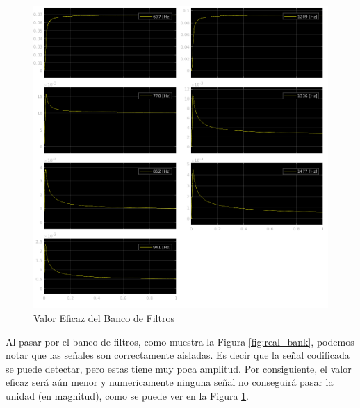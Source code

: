 \begin{figure}[!htb]
  \centering
  \includegraphics[width=\linewidth]{images/simulacion/reducido/rms.png}
  \caption{Valor Eficaz del Banco de Filtros}
  \label{fig:real_rms}
\end{figure}

\pagebreak

Al pasar por el banco de filtros, como muestra la Figura \ref{fig:real_bank}, podemos notar que las señales son correctamente aisladas. Es decir que la señal codificada se puede detectar, pero estas tiene muy poca amplitud. Por consiguiente, el valor eficaz será aún menor y numericamente ninguna señal no conseguirá pasar la unidad (en magnitud), como se puede ver en la Figura \ref{fig:real_rms}.

